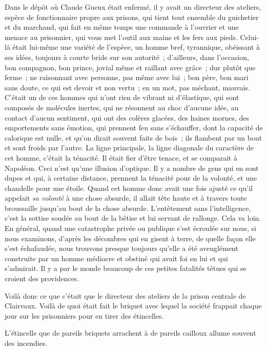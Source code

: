 \documentclass[french,twoside]{book} %
\begin{document}
Dans le dépôt où Claude Gueux était enfermé, il y avait un directeur des ateliers, espèce de fonctionnaire propre aux prisons, qui tient tout ensemble du guichetier et du marchand, qui fait en même temps une commande à l’ouvrier et une menace au prisonnier, qui vous met l’outil aux mains et les fers aux pieds. Celui-là était lui-même une variété de l’espèce, un homme bref, tyrannique, obéissant à ses idées, toujours à courte bride sur son autorité ; d’ailleurs, dans l’occasion, bon compagnon, bon prince, jovial  même et raillant avec grâce ; dur plutôt que ferme ; ne raisonnant avec personne, pas même avec lui ; bon père, bon mari sans doute, ce qui est devoir et non vertu ; en un mot, pas méchant, mauvais. C’était un de ces hommes qui n’ont rien de vibrant ni d’élastique, qui sont composés de molécules inertes, qui ne résonnent au choc d’aucune idée, au contact d’aucun sentiment, qui ont des colères glacées, des haines mornes, des emportements sans émotion, qui prennent feu sans s’échauffer, dont la capacité de calorique est nulle, et qu’on dirait souvent faits de bois ; ils flambent par un bout et sont froids par l’autre. La ligne principale, la ligne diagonale du caractère de cet homme, c’était la ténacité. Il était fier d’être tenace, et se comparait à Napoléon. Ceci n’est qu’une illusion d’optique. Il y a nombre de gens qui en sont dupes et qui, à certaine distance, prennent la ténacité pour de la volonté, et une chandelle pour une étoile. Quand cet homme donc avait une fois ajusté ce qu’il appelait \emph{sa volonté} à une chose absurde, il allait tête haute et à travers toute broussaille jusqu’au bout de la chose absurde. L’entêtement sans l’intelligence, c’est la sottise soudée au bout de la bêtise et lui servant de rallonge. Cela va loin. En général, quand une catastrophe privée ou publique s’est écroulée sur nous, si nous examinons, d’après les décombres qui en gisent à terre, de quelle façon elle s’est échafaudée, nous trouvons presque toujours qu’elle a été aveuglément construite par un homme médiocre et obstiné qui avait foi en lui et qui  s’admirait. Il y a par le monde beaucoup de ces petites fatalités têtues qui se croient des providences.\par
Voilà donc ce que c’était que le directeur des ateliers de la prison centrale de Clairvaux. Voilà de quoi était fait le briquet avec lequel la société frappait chaque jour sur les prisonniers pour en tirer des étincelles.\par
L’étincelle que de pareils briquets arrachent à de pareils cailloux allume souvent des incendies.\par
\end{document}
